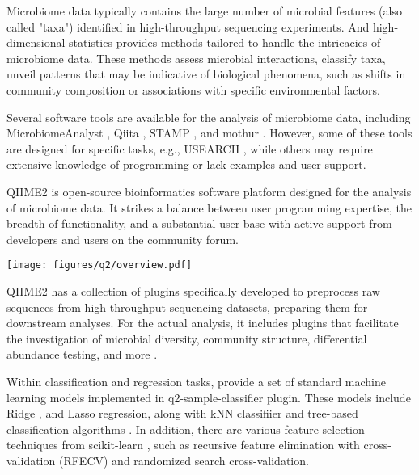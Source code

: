 \documentclass[10pt,a4paper]{article}
\let\cite\citep
\begin{document}
\begin{minipage}{0.5\textwidth}
    Microbiome data typically contains the large number of microbial features (also called "taxa") identified in high-throughput sequencing experiments. And high-dimensional statistics provides methods tailored to handle the intricacies of microbiome data. These methods assess microbial interactions, classify taxa, unveil patterns that may be indicative of biological phenomena, such as shifts in community composition or associations with specific environmental factors.

    Several software tools are available for the analysis of microbiome data, including MicrobiomeAnalyst \cite{dhariwal2017microbiomeanalyst}, Qiita \cite{gonzalez2018qiita}, STAMP \cite{parks2014stamp}, and mothur \cite{schloss2009introducing}. However, some of these tools are designed for specific tasks, e.g., USEARCH \cite{edgar2010search}, while others may require extensive knowledge of programming or lack examples and user support.
    
    QIIME2 is open-source bioinformatics software platform designed for the analysis of microbiome data. It strikes a balance between user programming expertise, the breadth of functionality, and a substantial user base with active support from developers and users on the community forum.
    
\end{minipage}
\hfill
\begin{minipage}{0.49\textwidth}
        \texttt{[image: figures/q2/overview.pdf]}
        \label{fig:q2_overview}
\end{minipage}

 \par QIIME2 has a collection of plugins specifically developed to preprocess raw sequences from high-throughput sequencing datasets, preparing them for downstream analyses. For the actual analysis, it includes plugins that facilitate the investigation of microbial diversity, community structure, differential abundance testing, and more \cite{bolyen2019reproducible}. 

\par Within classification and regression tasks, \cite{bokulich2018q2} provide a set of standard machine learning models implemented in q2-sample-classifier plugin. These models include Ridge \cite{hoerl1970ridge}, and Lasso \cite{tibshirani1996regression} regression, along with kNN classifiier \cite{altman1992introduction} and tree-based classification algorithms \cite{breiman2001random}. In addition, there are various feature selection techniques from scikit-learn \cite{pedregosa2011scikit}, such as recursive feature elimination with cross-validation (RFECV) and randomized search cross-validation. 
\end{document}
